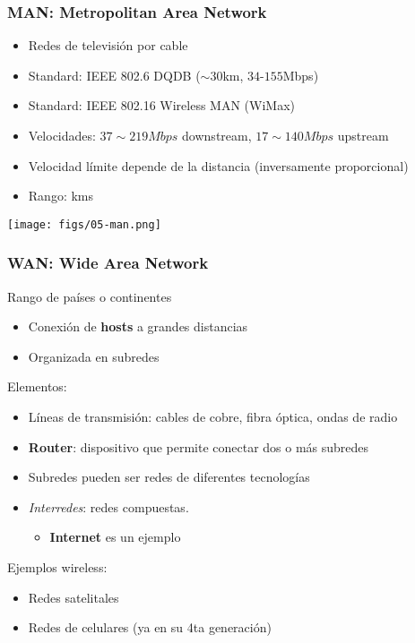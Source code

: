 \documentclass[letter]{beamer}
\begin{document}
\begin{frame}
  \frametitle{MAN: Metropolitan Area Network}

  \begin{itemize}
    \item Redes de televisión por cable
    \item Standard: IEEE 802.6 DQDB ($\sim 30$km, $34$-$155$Mbps)
    \item Standard: IEEE 802.16 Wireless MAN (WiMax)
    \item Velocidades: $37\sim 219Mbps$ downstream, $17\sim 140Mbps$ upstream
    \item Velocidad límite depende de la distancia (inversamente proporcional)
    \item Rango: kms
  \end{itemize}

  \begin{center}
    \texttt{[image: figs/05-man.png]}
  \end{center}

\end{frame}
\begin{frame}
  \frametitle{WAN: Wide Area Network}

  Rango de países o continentes
  \begin{itemize}
    \item Conexión de {\bf hosts} a grandes distancias
    \item Organizada en subredes
  \end{itemize}
  Elementos:
  \begin{itemize}
    \item Líneas de transmisión: cables de cobre, fibra óptica, ondas de radio
    \item {\bf Router}: dispositivo que permite conectar dos o más subredes
    \item Subredes pueden ser redes de diferentes tecnologías
    \item {\em Interredes}: redes compuestas.
      \begin{itemize}
        \item {\bf Internet} es un ejemplo
      \end{itemize}
  \end{itemize}
  Ejemplos wireless:
  \begin{itemize}
    \item Redes satelitales
    \item Redes de celulares (ya en su 4ta generación)
  \end{itemize}
\end{frame}
\end{document}

